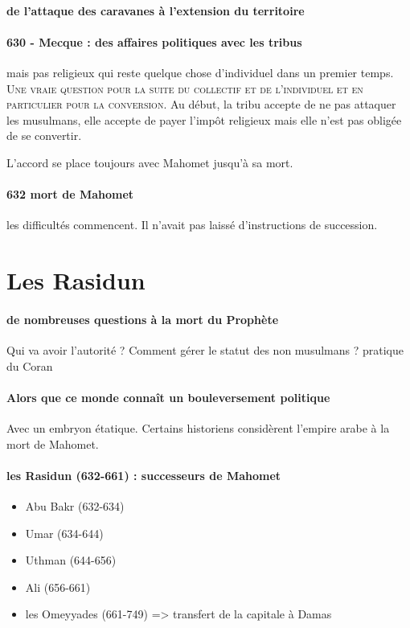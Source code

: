 \paragraph{de l'attaque des caravanes à l'extension du territoire} 

\paragraph{630 - Mecque : des affaires politiques avec les tribus} mais pas religieux qui reste quelque chose d'individuel dans un premier temps.  \textsc{Une vraie question pour la suite du collectif et de l'individuel et en particulier pour la conversion. }
Au début, la tribu accepte de ne pas attaquer les musulmans, elle accepte de payer l'impôt religieux mais elle n'est pas obligée de se convertir.

L'accord se place toujours avec Mahomet jusqu'à sa mort.

\paragraph{632 mort de Mahomet} les difficultés commencent.  Il n'avait pas laissé d'instructions de succession. 

\section{Les Rasidun}

\paragraph{de nombreuses questions à la mort du Prophète} Qui va avoir l'autorité ? Comment gérer le statut des non musulmans ? pratique du Coran

\paragraph{Alors que ce monde connaît un bouleversement politique} Avec un embryon étatique. Certains historiens considèrent l'empire arabe à la mort de Mahomet.


\paragraph{les Rasidun (632-661) : successeurs de Mahomet}
\begin{itemize}
  \item 	Abu Bakr (632-634)
\item 	Umar (634-644)
\item 	Uthman (644-656)
\item 	Ali (656-661)
\item 	les Omeyyades (661-749) => transfert de la capitale à Damas
\end{itemize}

